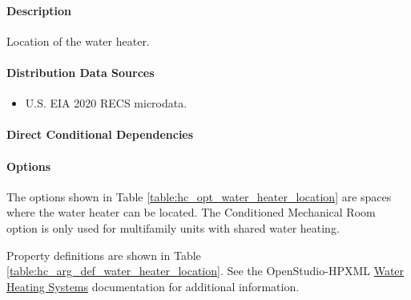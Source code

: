 \paragraph{Description}
% 
Location of the water heater.

\paragraph{Distribution Data Sources}
% 
\begin{itemize}
\item
  U.S. EIA 2020 RECS microdata.
\end{itemize}

\paragraph{Direct Conditional Dependencies}


\paragraph{Options}
The options shown in Table \ref{table:hc_opt_water_heater_location} are spaces where the water heater can be located. The Conditioned Mechanical Room option is only used for multifamily units with shared water heating.



Property definitions are shown in Table \ref{table:hc_arg_def_water_heater_location}. See the OpenStudio-HPXML \href{https://openstudio-hpxml.readthedocs.io/en/v1.10.0/workflow_inputs.html#hpxml-water-heating-systems}{Water Heating Systems} documentation for additional information.



